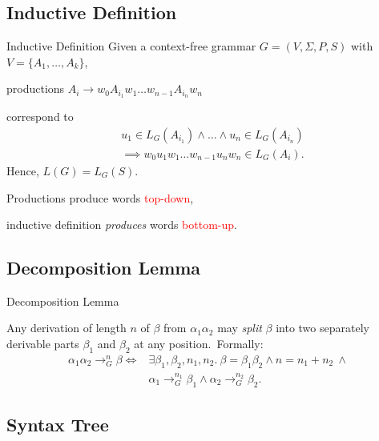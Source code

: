 \documentclass{beamer}
\def\spadding{\vspace{0.25cm}}
\def\r{\textcolor{red}}
\begin{document}
\subsection{Inductive Definition}

\begin{frame}{Inductive Definition}
    Given a context-free grammar $G = (V, \Sigma, P, S)$ with $V = \{A_1, \dots, A_k\}$,\pause\par
    productions $A_i \to w_0 A_{i_1}w_1 \dots w_{n-1} A_{i_n} w_n$\pause\par
    correspond to \begin{align*}
        &u_1 \in L_G(A_{i_1}) \land \dots \land u_n \in L_G(A_{i_n}) \\
        &\implies w_0 u_1 w_1 \dots w_{n-1} u_n w_n \in L_G(A_i).
    \end{align*}\pause
    Hence, $L(G) = L_G(S)$.\pause\par\spadding
    Productions produce words \r{top-down},\par
    inductive definition \textit{produces} words \r{bottom-up}.
\end{frame}

\subsection{Decomposition Lemma}

\begin{frame}{Decomposition Lemma}
    \begin{lemma}
        Any derivation of length $n$ of $\beta$ from $\alpha_1 \alpha_2$ may \textit{split} $\beta$ into two separately derivable parts $\beta_1$ and $\beta_2$ at any position.\pause\ Formally:
        \begin{align*}
            \alpha_1 \alpha_2 \to_G^n \beta \iff& \exists \beta_1, \beta_2, n_1, n_2.\ \beta = \beta_1 \beta_2 \land n = n_1 + n_2\ \land \\
                                                & \alpha_1 \to_G^{n_1} \beta_1 \land \alpha_2 \to_G^{n_2} \beta_2.
        \end{align*}
    \end{lemma}
\end{frame}

\subsection{Syntax Tree}
\end{document}
